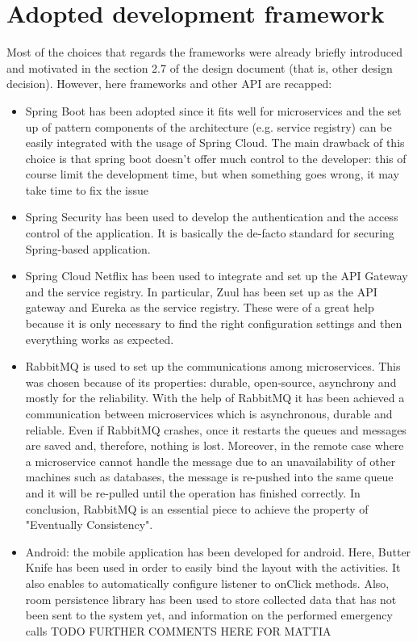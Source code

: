 \section{Adopted development framework}
Most of the choices that regards the frameworks were already briefly introduced and motivated in the
section 2.7 of the design document (that is, other design decision). 
However, here frameworks and other API are recapped:

\begin{itemize}

\item Spring Boot has been adopted since it fits well for microservices and the set up of pattern components
of the architecture (e.g. service registry) can be easily integrated with the usage of Spring Cloud.
The main drawback of this choice is that spring boot doesn't offer much control to the developer: this of
course limit the development time, but when something goes wrong, it may take time to fix the issue

\item Spring Security has been used to develop the authentication and the access control of the application.
It is basically the de-facto standard for securing Spring-based application. 

\item Spring Cloud Netflix has been used to integrate and set up the API Gateway and the service registry.
In particular, Zuul has been set up as the API gateway and Eureka as the service registry. 
These were of a great help because it is only necessary to find the right configuration settings and then everything works as expected.

\item RabbitMQ is used to set up the communications among microservices. This was chosen because of its properties: durable, 
open-source, asynchrony and mostly for the reliability. With the help of RabbitMQ it has been achieved a communication 
between microservices which is asynchronous, durable and reliable. Even if RabbitMQ crashes, once it restarts the queues 
and messages are saved and, therefore, nothing is lost. Moreover, in the remote case where a microservice cannot handle 
the message due to an unavailability of other machines such as databases, the message is re-pushed into the same queue and it 
will be re-pulled until the operation has finished correctly. In conclusion, RabbitMQ is an essential piece to achieve the property 
of "Eventually Consistency".

\item Android: the mobile application has been developed for android. Here, Butter Knife has been used in order to easily bind the layout with the activities. It also enables to automatically configure listener to onClick methods. Also, room persistence library has been used to store
collected data that has not been sent to the system yet, and information on the performed emergency calls
TODO FURTHER COMMENTS HERE FOR MATTIA

\end{itemize}

